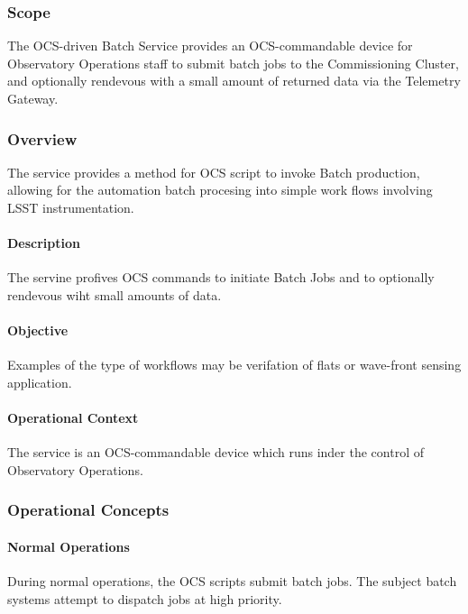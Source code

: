 ﻿\subsubsection{Scope}

The OCS-driven Batch Service provides an OCS-commandable device for Observatory
Operations staff to submit batch jobs to the Commissioning Cluster, and optionally rendevous 
with a small amount of returned data via the Telemetry Gateway.

\subsubsection{Overview}

The service provides a method for OCS script to invoke Batch
production, allowing for the automation batch procesing into simple work
flows involving LSST instrumentation.


\paragraph{Description}

The servine profives OCS commands to initiate Batch Jobs and to optionally
rendevous wiht small amounts of data. 

\paragraph{Objective}

Examples of the type of workflows may be verifation of flats or wave-front sensing
application.


\paragraph{Operational Context}

The service is an OCS-commandable device which runs inder the control of
Observatory  Operations.

\subsubsection{Operational Concepts}

\paragraph{Normal Operations}

During normal operations, the OCS scripts submit batch jobs. The subject batch systems attempt to dispatch jobs at high priority. 

